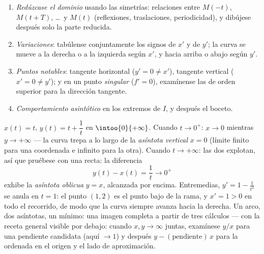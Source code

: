\begin{method}\label{met:b1:curves:study}
\begin{enumerate}
  \item \emph{Redúzcase el dominio} usando las simetrías: relaciones
        entre $M(-t)$, $M(t + T)$, \dots\ y $M(t)$ (reflexiones,
        traslaciones, periodicidad), y dibújese después solo la
        parte reducida.
  \item \emph{Variaciones}: tabúlense conjuntamente los signos de
        $x'$ y de $y'$; la curva se mueve a la derecha o a la
        izquierda según $x'$, y hacia arriba o abajo según $y'$.
  \item \emph{Puntos notables}: tangente horizontal
        ($y' = 0 \neq x'$), tangente vertical ($x' = 0 \neq y'$); y
        en un punto \emph{singular} ($f' = 0$), examínense las
         de orden superior para la dirección tangente.
  \item \emph{Comportamiento asintótico} en los extremos de $I$, y
        después el boceto.
\end{enumerate}
\end{method}

\begin{example}
\label{ex:b1:curves:asymptotes}
$x(t) = t$, $y(t) = t + \dfrac1t$ en $\intoo{0}{+\infty}$. Cuando
$t \to 0^{+}$: $x \to 0$ mientras $y \to +\infty$ --- la curva trepa
a lo largo de la \emph{asíntota vertical} $x = 0$ (límite finito para
una coordenada e infinito para la otra). Cuando $t \to +\infty$: las
dos  explotan, así que pruébese con una recta: la
diferencia
\[
y(t) - x(t) = \frac1t \longrightarrow 0^{+}
\]
exhibe la \emph{asíntota oblicua} $y = x$, alcanzada por encima.
Entremedias, $y' = 1 - \frac1{t^2}$ se anula en $t = 1$: el punto
$(1, 2)$ es el punto bajo de la rama, y $x' = 1 > 0$ en todo el
recorrido, de modo que la curva siempre avanza hacia la derecha. Un
arco, dos asíntotas, un mínimo: una imagen completa a partir de tres
cálculos --- con la receta general visible por debajo: cuando
$x, y \to \infty$ juntas, examínese $y/x$ para una pendiente
candidata (aquí $\to 1$) y después $y - (\text{pendiente})\,x$ para
la ordenada en el origen y el lado de aproximación.
\end{example}

